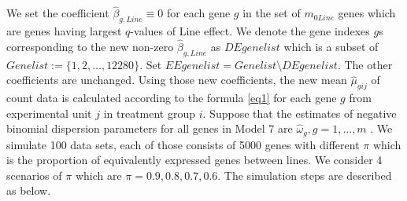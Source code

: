 \documentclass[12pt, letter]{article}\usepackage[]{graphicx}\usepackage[]{color}
\begin{document}
We set the coefficient $\hat{\beta}_{g,Line} \equiv 0$ for each gene $g$ in the set of $m_{0Line}$ genes which are genes having largest  $q$-values of Line effect. We denote the gene indexes $g$s corresponding to the new non-zero $\hat{\beta}_{g,Line}$ as $DEgenelist$ which is a subset of $Genelist :=\{1, 2, \dots, 12280\}$. Set $EEgenelist = Genelist\setminus DEgenelist$. The other coefficients are unchanged. Using those new coefficients, the new mean $\hat{\mu}_{gij}$  of count data  is calculated according to the formula \eqref{eq1} for each gene $g$ from experimental unit $j$ in treatment group $i$. Suppose that the estimates of negative binomial dispersion parameters for all genes in Model 7 are $\hat{\omega}_{g}, g = 1, \dots, m$ . We simulate 100 data sets, each of those consists of 5000 genes with different  $\pi$  which is the proportion of equivalently expressed  genes between lines. We consider 4 scenarios of $\pi$ which are $ \pi = 0.9, 0.8, 0.7, 0.6$. The simulation steps  are described as below. 
\end{document}
